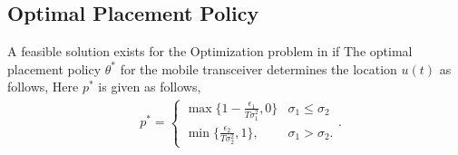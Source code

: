 \documentclass[a4paper,english,12pt]{article}
\begin{document}
\subsection{Optimal Placement Policy}
\begin{thm}\label{Placement  Policy}
A feasible solution exists for the Optimization problem in  if
The optimal placement policy $\theta^*$ for the mobile transceiver determines the location $u(t)$ as follows, 
    Here $p^*$ is given as follows,
    \begin{align}\label{placement}
    & p^* =\begin{cases}
      \max \{1-\frac{\epsilon_1}{T \sigma_1^2}, 0\} & \sigma_1 \leq \sigma_2\\
     \min\{\frac{\epsilon_2}{T \sigma_2^2},1\}, &  \sigma_1 > \sigma_2.
    \end{cases}.
    \end{align}
\end{thm}
\end{document}
